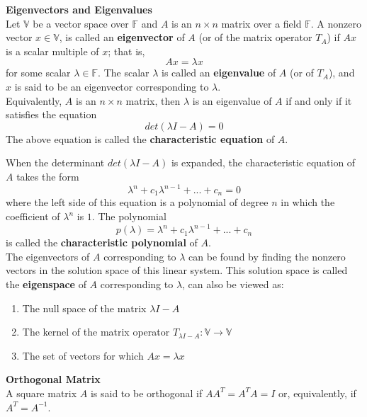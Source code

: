 \documentclass[12pt]{report}
\def\F{{\mathbb F}}
\def\V{{ \mathbb V}}
\begin{document}
\begin{defn}
\textbf{Eigenvectors and Eigenvalues}\\
Let $\V$ be a vector  space over $\F$ and $A$ is an $n \times n$ matrix over a field $\F$. A nonzero vector $x \in \V$, is called an \textbf{eigenvector} of $A$ (or of the matrix operator $T_A$) if $Ax$ is a scalar multiple of $x$; that is,
\begin{equation} Ax = \lambda x\end{equation}
for some scalar $\lambda \in \F$. The scalar $\lambda$ is called an \textbf{eigenvalue} of $A$ (or of $T_A$), and $x$ is said to be an eigenvector corresponding to $\lambda$.\\
Equivalently, $A$ is an $n \times n$ matrix, then $\lambda$ is an eigenvalue of $A$ if and only if it satisfies the equation
\begin{equation} det(\lambda I - A) = 0\end{equation}
The above equation is  called the \textbf{characteristic equation} of $A$. 

When the determinant $det(\lambda I - A)$ is expanded, the characteristic equation of $A$ takes the form
\begin{equation} \lambda^n+c_1\lambda^{n-1}+...+c_n  = 0\end{equation}
where the left side of this equation is a polynomial of degree $n$ in which the coefficient of $\lambda^n$ is $1$. The polynomial \begin{equation} p(\lambda) = \lambda^n+c_1\lambda^{n-1}+...+c_n \end{equation}
is called the \textbf{characteristic polynomial} of $A$. \\ 

The eigenvectors of $A$ corresponding to $\lambda$ can be found by finding the nonzero vectors in the solution space of this linear system. This solution space is called the \textbf{eigenspace} of $A$ corresponding to $\lambda$, can also be viewed as:\begin{enumerate}
\item The null space of the matrix $\lambda I - A$
\item The kernel of the matrix operator $T_{\lambda I-A}:\V \to \V$
\item The set of vectors for which $Ax = \lambda x$
\end{enumerate}
\end{defn}
\begin{defn}
	\textbf{Orthogonal Matrix}\\
	A square matrix $A$ is said to be orthogonal if $AA^T = A^T A = I $ or, equivalently, if $A^T = A^{-1}$.\\
\end{defn}
\end{document}
